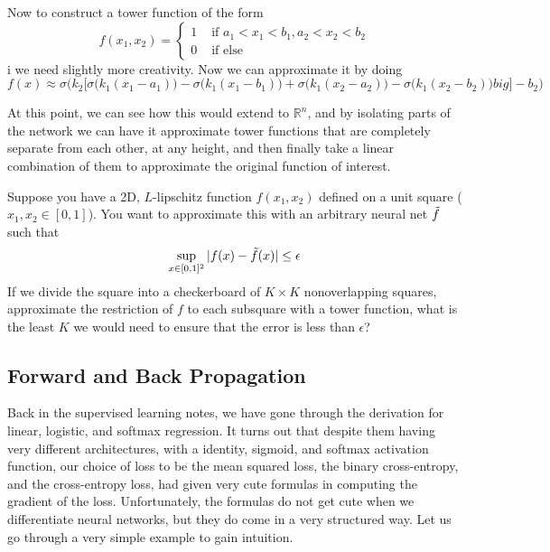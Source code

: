 \documentclass{article}
\begin{document}
      \begin{example} 
        Now to construct a tower function of the form 
          \[f(x_1, x_2) = \begin{cases} 1 & \text{ if } a_1 < x_1 < b_1, a_2 < x_2 < b_2 \\ 0 & \text{ if else} \end{cases}\]i
        we need slightly more creativity. Now we can approximate it by doing 
          \[f(x) \approx \sigma \bigg( k_2 \big[ \sigma\big( k_1 (x_1 - a_1)\big) - \sigma\big( k_1 (x_1 -b_1)\big) + \sigma \big( k_1 (x_2 - a_2)\big) - \sigma\big(k_1 (x_2 - b_2)\big)  big] - b_2\bigg)\]
      \end{example} 

      At this point, we can see how this would extend to $\mathbb{R}^n$, and by isolating parts of the network we can have it approximate tower functions that are completely separate from each other, at any height, and then finally take a linear combination of them to approximate the original function of interest.  

      \begin{theorem}
        Suppose you have a 2D, $L$-lipschitz function $f(x_1, x_2)$ defined on a unit square ($x_1, x_2 \in \left [0,1 \right ]$). You want to approximate this with an arbitrary neural net $\Tilde{f}$ such that
          \[\sup_{x \in [0, 1]^2} |f(x) - \Tilde{f}(x)| \leq \epsilon\]    
        If we divide the square into a checkerboard of $K \times K$ nonoverlapping squares, approximate the restriction of $f$ to each subsquare with a tower function, what is the least $K$ we would need to ensure that the error is less than $\epsilon$? 
      \end{theorem} 

  \subsection{Forward and Back Propagation}

    Back in the supervised learning notes, we have gone through the derivation for linear, logistic, and softmax regression. It turns out that despite them having very different architectures, with a identity, sigmoid, and softmax activation function, our choice of loss to be the mean squared loss, the binary cross-entropy, and the cross-entropy loss, had given very cute formulas in computing the gradient of the loss. Unfortunately, the formulas do not get cute when we differentiate neural networks, but they do come in a very structured way. Let us go through a very simple example to gain intuition. 
\end{document}
